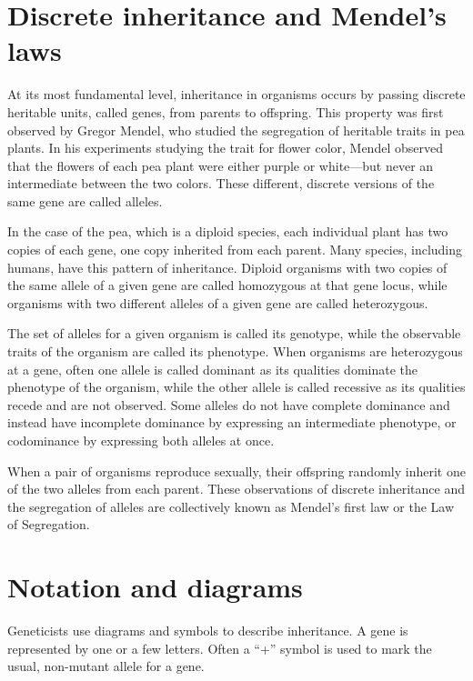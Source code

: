 \hypertarget{discrete-inheritance-and-mendels-laws}{%
\section{Discrete inheritance and Mendel's laws}\label{discrete-inheritance-and-mendels-laws}}

At its most fundamental level, inheritance in organisms occurs by passing discrete heritable units, called genes, from parents to offspring. This property was first observed by Gregor Mendel, who studied the segregation of heritable traits in pea plants. In his experiments studying the trait for flower color, Mendel observed that the flowers of each pea plant were either purple or white---but never an intermediate between the two colors. These different, discrete versions of the same gene are called alleles.

In the case of the pea, which is a diploid species, each individual plant has two copies of each gene, one copy inherited from each parent. Many species, including humans, have this pattern of inheritance. Diploid organisms with two copies of the same allele of a given gene are called homozygous at that gene locus, while organisms with two different alleles of a given gene are called heterozygous.

The set of alleles for a given organism is called its genotype, while the observable traits of the organism are called its phenotype. When organisms are heterozygous at a gene, often one allele is called dominant as its qualities dominate the phenotype of the organism, while the other allele is called recessive as its qualities recede and are not observed. Some alleles do not have complete dominance and instead have incomplete dominance by expressing an intermediate phenotype, or codominance by expressing both alleles at once.

When a pair of organisms reproduce sexually, their offspring randomly inherit one of the two alleles from each parent. These observations of discrete inheritance and the segregation of alleles are collectively known as Mendel's first law or the Law of Segregation.

\hypertarget{notation-and-diagrams}{%
\section{Notation and diagrams}\label{notation-and-diagrams}}

Geneticists use diagrams and symbols to describe inheritance. A gene is represented by one or a few letters. Often a ``+'' symbol is used to mark the usual, non-mutant allele for a gene.

